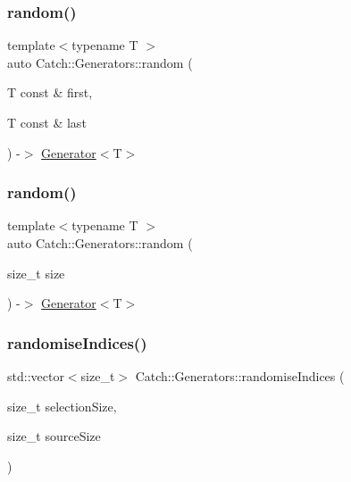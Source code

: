\subsubsection{\texorpdfstring{random()}{random()}\hspace{0.1cm}{\footnotesize\ttfamily [1/2]}}
{\footnotesize\ttfamily template$<$typename T $>$ \\
auto Catch\+::\+Generators\+::random (\begin{DoxyParamCaption}\item[{T const \&}]{first,  }\item[{T const \&}]{last }\end{DoxyParamCaption}) -\/$>$ \mbox{\hyperlink{class_catch_1_1_generators_1_1_generator}{Generator}}$<$T$>$ }

\mbox{\label{namespace_catch_1_1_generators_a81f960beb999d6ebc1d50036122b8ee0}} 
\subsubsection{\texorpdfstring{random()}{random()}\hspace{0.1cm}{\footnotesize\ttfamily [2/2]}}
{\footnotesize\ttfamily template$<$typename T $>$ \\
auto Catch\+::\+Generators\+::random (\begin{DoxyParamCaption}\item[{size\+\_\+t}]{size }\end{DoxyParamCaption}) -\/$>$ \mbox{\hyperlink{class_catch_1_1_generators_1_1_generator}{Generator}}$<$T$>$ }

\mbox{\label{namespace_catch_1_1_generators_a4ee4b9f5df1ceedc8ffc6c31b5a7d68b}} 
\subsubsection{\texorpdfstring{randomise\+Indices()}{randomiseIndices()}}
{\footnotesize\ttfamily std\+::vector$<$size\+\_\+t$>$ Catch\+::\+Generators\+::randomise\+Indices (\begin{DoxyParamCaption}\item[{size\+\_\+t}]{selection\+Size,  }\item[{size\+\_\+t}]{source\+Size }\end{DoxyParamCaption})}

